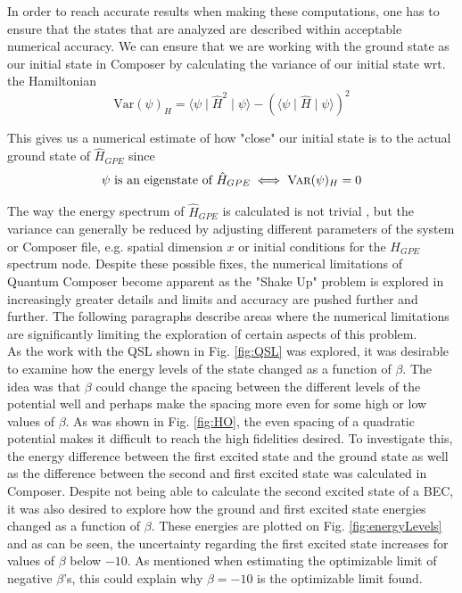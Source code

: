 \documentclass[a4paper, twocolumn]{revtex4-1}
\begin{document}
In order to reach accurate results when making these computations, one has to ensure that the states that are analyzed are described within acceptable numerical accuracy. We can ensure that we are working with the ground state as our initial state in Composer by calculating the variance of our initial state wrt. the Hamiltonian
\begin{equation}
	\text{Var}(\psi)_H = \langle \psi \mid \hat{H}^2 \mid \psi \rangle - \left(\langle \psi \mid \hat{H} \mid \psi \rangle\right)^2
\end{equation}

This gives us a numerical estimate of how "close" our initial state is to the actual ground state of $\hat{H}_{GPE}$ since
\begin{equation}
	\psi \text{ is an eigenstate of } \hat{H}_{GPE} \iff \textsc{Var}(\psi)_H = 0
\end{equation}

The way the energy spectrum of $\hat{H}_{GPE}$ is calculated is not trivial \cite{QEngine}, but the variance can generally be reduced by adjusting different parameters of the system or Composer file, e.g. spatial dimension $x$ or initial conditions for the $H_{GPE}$ spectrum node. Despite these possible fixes, the numerical limitations of Quantum Composer become apparent as the "Shake Up" problem is explored in increasingly greater details and limits and accuracy are pushed further and further. The following paragraphs describe areas where the numerical limitations are significantly limiting the exploration of certain aspects of this problem.\\

As the work with the QSL shown in Fig. \ref{fig:QSL} was explored, it was desirable to examine how the energy levels of the state changed as a function of $\beta$. The idea was that $\beta$ could change the spacing between the different levels of the potential well and perhaps make the spacing more even for some high or low values of $\beta$. As was shown in Fig. \ref{fig:HO}, the even spacing of a quadratic potential makes it difficult to reach the high fidelities desired. To investigate this, the energy difference between the first excited state and the ground state as well as the difference between the second and first excited state was calculated in Composer.
Despite not being able to calculate the second excited state of a BEC, it was also desired to explore how the ground and first excited state energies changed as a function of $\beta$. These energies are plotted on Fig. \ref{fig:energyLevels} and as can be seen, the uncertainty regarding the first excited state increases for values of $\beta$ below $-10$. As mentioned when estimating the optimizable limit of negative $\beta$'s, this could explain why $\beta=-10$ is the optimizable limit found.\\
\end{document}

